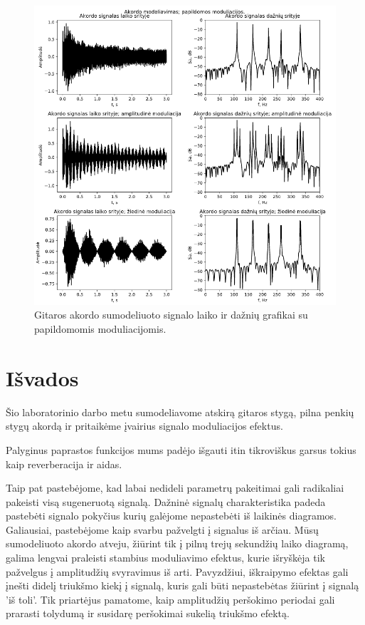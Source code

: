 \documentclass[10pt,a4paper,twocolumn]{article}
\begin{document}
\begin{figure} %
	[!h]
	\centering
	\includegraphics*[width=.9\columnwidth]{papildmod.png} %
	\caption{Gitaros akordo sumodeliuoto signalo laiko ir dažnių grafikai su papildomomis moduliacijomis.}
	\label{papildmod}
	\vspace{6pt}
\end{figure}


\section*{Išvados}
Šio laboratorinio darbo metu sumodeliavome atskirą gitaros stygą, pilna penkių stygų akordą ir pritaikėme įvairius signalo moduliacijos efektus.

Palyginus paprastos funkcijos mums padėjo išgauti itin tikroviškus garsus tokius kaip reverberacija ir aidas.

Taip pat pastebėjome, kad labai nedideli parametrų pakeitimai gali radikaliai pakeisti visą sugeneruotą signalą. Dažninė signalų charakteristika padeda pastebėti signalo pokyčius kurių galėjome nepastebėti iš laikinės diagramos. 
Galiausiai, pastebėjome kaip svarbu pažvelgti į signalus iš arčiau. Mūsų sumodeliuoto akordo atveju, žiūrint tik į pilnų trejų sekundžių laiko diagramą, galima lengvai praleisti stambius moduliavimo efektus, kurie išryškėja tik pažvelgus į amplitudžių svyravimus iš arti. Pavyzdžiui, iškraipymo efektas gali įnešti didelį triukšmo kiekį į signalą, kuris gali būti nepastebėtas žiūrint į signalą 'iš toli'. Tik priartėjus pamatome, kaip amplitudžių peršokimo periodai gali prarasti tolydumą ir susidarę peršokimai sukelią triukšmo efektą.
\end{document}
